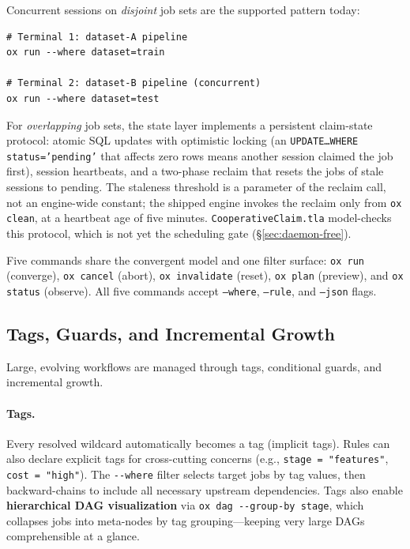 \documentclass[12pt,a4paper]{article}
\newcommand{\code}[1]{{\texttt{\small\color{inlinecode}#1}}}
\begin{document}
\noindent Concurrent sessions on \emph{disjoint} job sets are the
supported pattern today:

\begin{lstlisting}[style=shell]
# Terminal 1: dataset-A pipeline
ox run --where dataset=train

# Terminal 2: dataset-B pipeline (concurrent)
ox run --where dataset=test
\end{lstlisting}

For \emph{overlapping} job sets, the state layer implements a
persistent claim-state protocol: atomic SQL updates with optimistic locking
(an \code{UPDATE\ldots WHERE status='pending'} that affects zero rows
means another session claimed the job first), session heartbeats, and a
two-phase reclaim that resets the jobs of stale sessions to pending.
The staleness threshold is a parameter of the reclaim call, not an
engine-wide constant; the shipped engine invokes the reclaim only from
\code{ox clean}, at a heartbeat age of five minutes.
\code{Cooperative\allowbreak Claim.tla}
model-checks this protocol, which is not yet the scheduling gate
(\S\ref{sec:daemon-free}).

Five commands share the convergent model and one filter surface:
\code{ox run} (converge), \code{ox cancel} (abort), \code{ox
invalidate} (reset), \code{ox plan} (preview), and \code{ox status}
(observe). All five commands accept \code{--where}, \code{--rule}, and
\code{--json} flags.

\subsection{Tags, Guards, and Incremental Growth}
\label{sec:tags}

Large, evolving workflows are managed through tags, conditional
guards, and incremental growth.

\paragraph{Tags.}
Every resolved wildcard automatically becomes a tag (implicit tags).
Rules can also declare explicit tags for cross-cutting concerns
(e.g., \code{stage\,=\,"features"}, \code{cost\,=\,"high"}).
The \code{-{}-where} filter selects target jobs by tag values,
then backward-chains to include all necessary upstream dependencies.
Tags also enable \textbf{hierarchical DAG visualization} via
\code{ox\,dag\,-{}-group-by\,stage}, which collapses jobs into
meta-nodes by tag grouping---keeping very large DAGs comprehensible
at a glance.
\end{document}
